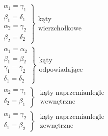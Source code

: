     \begin{gather}
      \left.
      \begin{gathered}
        \alpha_1 = \gamma_1\\
        \beta_1 = \delta_1\\
        \alpha_2 = \gamma_2\\
        \beta_2 = \delta_2
      \end{gathered}
      \right\}
      \begin{gathered}
        \text{kąty}\\
        \text{wierzchołkowe}
      \end{gathered}\\
      \left.
      \begin{gathered}
        \alpha_1 = \alpha_2\\
        \beta_1 = \beta_2\\
        \gamma_1 = \gamma_2\\
        \delta_1 = \delta_2
      \end{gathered}
      \right\}
      \begin{gathered}
        \text{kąty}\\
        \text{odpowiadające}
      \end{gathered}\\
      \left.
      \begin{gathered}
        \alpha_2 = \gamma_1\\
        \delta_2 = \beta_1
      \end{gathered}
      \right\}\;
      \begin{gathered}
        \text{kąty naprzemianległe}\\
        \text{wewnętrzne}
      \end{gathered}\\
      \left.
      \begin{gathered}
        \alpha_1 = \gamma_2\\
        \delta_1 = \beta_2
      \end{gathered}
      \right\}\;
      \begin{gathered}
        \text{kąty naprzemianległe}\\
        \text{zewnętrzne}
      \end{gathered}
    \end{gather}
    \begin{theorem}
      
    \end{theorem}
